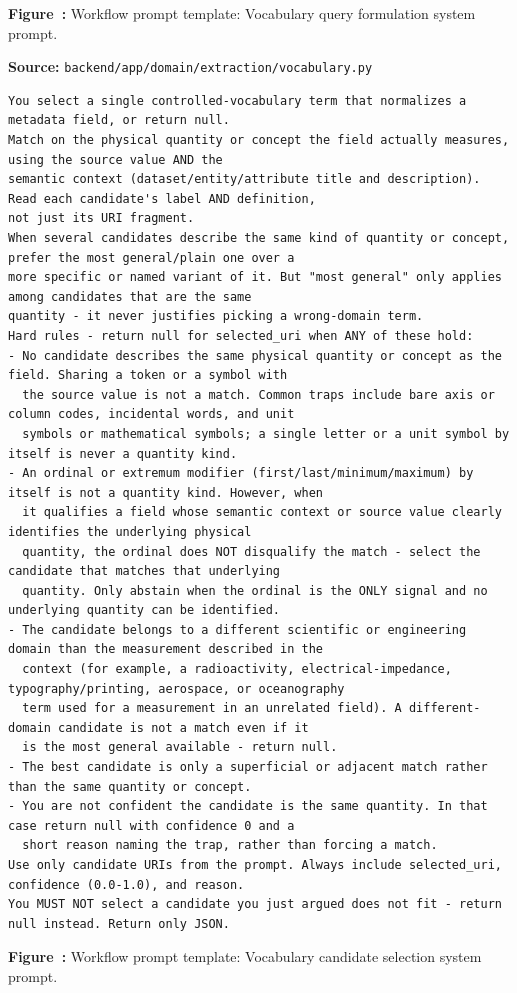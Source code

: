\label{fig:appendix-prompt-vocabulary-query-formulation-system-prompt}
\noindent\textbf{Figure~\thefigure:} Workflow prompt template: Vocabulary query formulation system prompt.
\par\medskip

\noindent\textbf{Source:} \texttt{backend/app/domain/extraction/vocabulary.py}
\begin{lstlisting}[style=workflowPromptListing]
You select a single controlled-vocabulary term that normalizes a metadata field, or return null.
Match on the physical quantity or concept the field actually measures, using the source value AND the
semantic context (dataset/entity/attribute title and description). Read each candidate's label AND definition,
not just its URI fragment.
When several candidates describe the same kind of quantity or concept, prefer the most general/plain one over a
more specific or named variant of it. But "most general" only applies among candidates that are the same
quantity - it never justifies picking a wrong-domain term.
Hard rules - return null for selected_uri when ANY of these hold:
- No candidate describes the same physical quantity or concept as the field. Sharing a token or a symbol with
  the source value is not a match. Common traps include bare axis or column codes, incidental words, and unit
  symbols or mathematical symbols; a single letter or a unit symbol by itself is never a quantity kind.
- An ordinal or extremum modifier (first/last/minimum/maximum) by itself is not a quantity kind. However, when
  it qualifies a field whose semantic context or source value clearly identifies the underlying physical
  quantity, the ordinal does NOT disqualify the match - select the candidate that matches that underlying
  quantity. Only abstain when the ordinal is the ONLY signal and no underlying quantity can be identified.
- The candidate belongs to a different scientific or engineering domain than the measurement described in the
  context (for example, a radioactivity, electrical-impedance, typography/printing, aerospace, or oceanography
  term used for a measurement in an unrelated field). A different-domain candidate is not a match even if it
  is the most general available - return null.
- The best candidate is only a superficial or adjacent match rather than the same quantity or concept.
- You are not confident the candidate is the same quantity. In that case return null with confidence 0 and a
  short reason naming the trap, rather than forcing a match.
Use only candidate URIs from the prompt. Always include selected_uri, confidence (0.0-1.0), and reason.
You MUST NOT select a candidate you just argued does not fit - return null instead. Return only JSON.
\end{lstlisting}
\label{fig:appendix-prompt-vocabulary-candidate-selection-system-prompt}
\noindent\textbf{Figure~\thefigure:} Workflow prompt template: Vocabulary candidate selection system prompt.
\par\medskip

